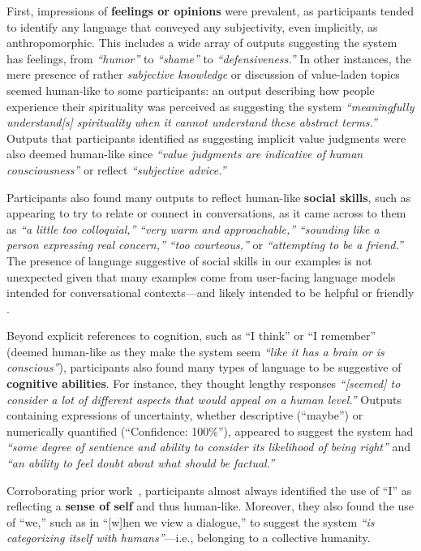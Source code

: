 \documentclass[11pt]{article}
\begin{document}
First, impressions of {\bf feelings or opinions} were prevalent, as participants tended to identify any language that conveyed any subjectivity, even implicitly, as anthropomorphic. 
This includes a wide array of outputs suggesting the system has feelings, from \textit{``humor''} to \textit{``shame''} to \textit{``defensiveness.''} In other instances, the mere presence of rather \textit{subjective knowledge} or discussion of value-laden topics seemed human-like to some participants: an output describing how people experience their spirituality was perceived as suggesting the system \textit{``meaningfully understand[s] spirituality when it cannot understand these abstract terms.''} 
Outputs that participants identified as suggesting implicit value judgments were also deemed human-like since \textit{``value judgments are indicative of human consciousness''} or reflect \textit{``subjective advice.''}

Participants also found many outputs to reflect human-like \textbf{social skills}, such as appearing to try to relate or connect in conversations, as it came across to them as \textit{``a little too colloquial,''} \textit{``very warm and approachable,''} \textit{``sounding like a person expressing real concern,''} \textit{``too courteous,''} or \textit{``attempting to be a friend.''}  
The presence of language suggestive of social skills in our examples is not unexpected given that many examples come from user-facing language models intended for conversational contexts---and likely intended to be helpful or friendly \cite{bai2022training,wu2023brief}.



Beyond explicit references to cognition, such as ``I think'' or ``I remember'' (deemed human-like as they make the system seem \textit{``like it has a brain or is conscious''}), participants also found many types of language to be suggestive of \textbf{cognitive abilities}.
For instance, they thought lengthy responses \textit{``[seemed] to consider a lot of different aspects that would appeal on a human level.''} 
Outputs containing expressions of uncertainty, whether descriptive (``maybe'') or numerically quantified (``Confidence: 100\%''), appeared to suggest the system had \textit{``some degree of sentience and ability to consider its likelihood of being right''} and \textit{``an ability to feel doubt about what should be factual.''}   


Corroborating prior work~\cite{abercrombie-etal-2023-mirages}, participants almost always identified the use of ``I'' as reflecting a \textbf{sense of self} and thus human-like. 
Moreover, they also found the use of ``we,'' such as in ``[w]hen we view a dialogue,'' to suggest the system \textit{``is categorizing itself with humans''}---i.e., belonging to a collective humanity.
\end{document}

